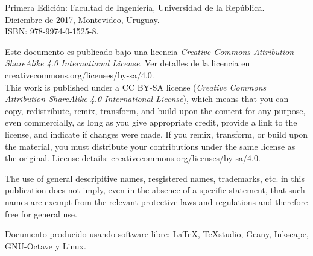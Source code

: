 \documentclass[spanish,twoside,openright,10pt]{book}
\begin{document}
\noindent
Primera Edición: Facultad de Ingeniería, Universidad de la República.\\
Diciembre de 2017, Montevideo, Uruguay.\\
ISBN: 978-9974-0-1525-8.\\

\vfill
\begin{small}

\noindent
Este documento es publicado bajo una licencia \textit{Creative Commons Attribution-ShareAlike 4.0 International License}. Ver detalles de la licencia en creativecommons.org/licenses/by-sa/4.0.\\

\noindent
This work is published under a CC BY-SA license (\textit{Creative Commons Attribution-ShareAlike 4.0 International License}), which means that you can copy, redistribute, remix, transform, and build upon the content for any purpose, even commercially, as long as you give appropriate credit, provide a link to the license, and indicate if changes were made. If you remix, transform, or build upon the material, you must distribute your contributions under the same license as the original. License details: \href{https://creativecommons.org/licenses/by-sa/4.0/}{creativecommons.org/licenses/by-sa/4.0}.

\vspace{2mm}

\noindent
The use of general descripitive names, resgistered names, trademarks, etc. in this publication does not imply, even in the absence of a specific statement, that such names are exempt from the relevant protective laws and regulations and therefore free for general use.

\end{small}

\vspace{3mm}

\noindent
\begin{footnotesize}
Documento producido usando \href{https://es.wikipedia.org/wiki/Software_libre}{software libre}: \LaTeX, TeXstudio, Geany, Inkscape, GNU-Octave y Linux.
\end{footnotesize}

\tableofcontents
\thispagestyle{empty}

\mainmatter




 






%

%
%

\end{document}
